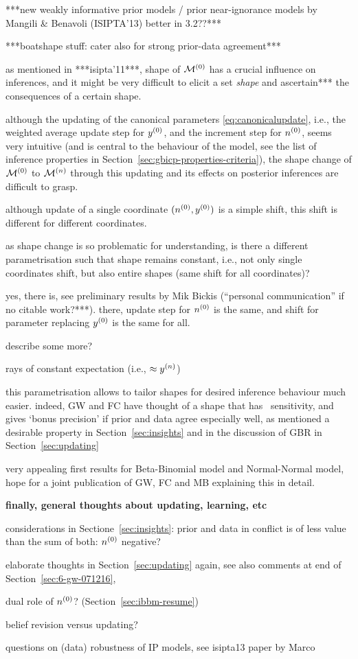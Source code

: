 ***new weakly informative prior models / prior near-ignorance models by Mangili \& Benavoli (ISIPTA'13) better in 3.2??***


***boatshape stuff: cater also for strong prior-data agreement***

as mentioned in ***isipta'11***, shape of $\mathcal{M}^{(0)}$ has a crucial influence on inferences,
and it might be very difficult to elicit a set \emph{shape} and ascertain*** the consequences of a certain shape.

although the updating of the canonical parameters \eqref{eq:canonicalupdate},
i.e., the weighted average update step for $y^{(0)}$, and the increment step for $n^{(0)}$,
seems very intuitive (and is central to the behaviour of the model,
see the list of inference properties in Section~\ref{sec:gbicp-properties-criteria}),
the shape change of $\mathcal{M}^{(0)}$ to $\mathcal{M}^{(n)}$ through this updating and its effects on posterior inferences are difficult to grasp.

although update of a single coordinate $(n^{(0)},y^{(0)})$ is a simple shift,
this shift is different for different coordinates.

as shape change is so problematic for understanding,
is there a different parametrisation such that shape remains constant,
i.e., not only single coordinates shift, but also entire shapes
(same shift for all coordinates)?

yes, there is, see preliminary results by Mik Bickis (``personal communication'' if no citable work?***).
there, update step for $n^{(0)}$ is the same, and shift for parameter replacing $y^{(0)}$ is the same for all. 

describe some more?

rays of constant expectation (i.e., $\approx y^{(n)}$)

this parametrisation allows to tailor shapes for desired inference behaviour much easier.
indeed, GW and FC have thought of a shape that has \pdc\ sensitivity,
and gives `bonus precision' if prior and data agree especially well,
as mentioned a desirable property in Section~\ref{sec:insights}
and in the discussion of GBR in Section~\ref{sec:updating}

very appealing first results for Beta-Binomial model and Normal-Normal model,
hope for a joint publication of GW, FC and MB explaining this in detail.


\textbf{finally, general thoughts about updating, learning, etc}

considerations in Sectione~\ref{sec:insights}:
prior and data in conflict is of less value than the sum of both:
$n^{(0)}$ negative?


elaborate thoughts in Section~\ref{sec:updating} again,
see also comments at end of Section~\ref{sec:6-gw-071216},

dual role of $n^{(0)}$? (Section~\ref{sec:ibbm-resume})

belief revision versus updating?

questions on (data) robustness of IP models, see isipta13 paper by Marco


